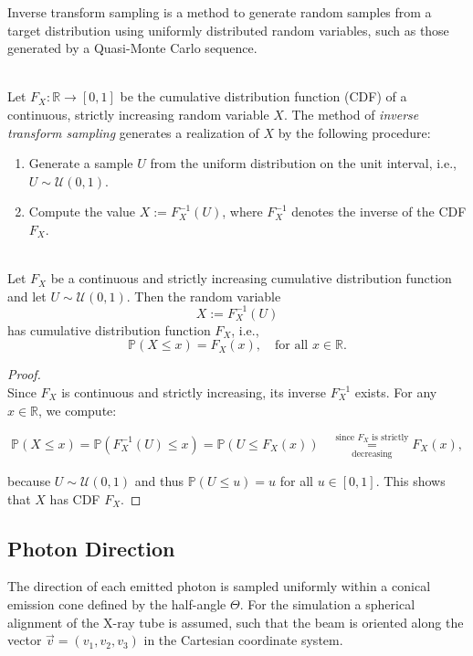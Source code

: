 Inverse transform sampling \cite{muller2012monte} is a method to generate random samples from a target distribution using uniformly distributed random variables, such as those generated by a Quasi-Monte Carlo sequence.

\begin{definition}\ \\
    \label{def:inverse_transform_sampling}
    Let $F_X: \mathbb{R} \to [0,1]$ be the cumulative distribution function (CDF) of a continuous, strictly increasing random variable $X$. The method of \emph{inverse transform sampling} generates a realization of $X$ by the following procedure:

    \begin{enumerate}
        \item Generate a sample $U$ from the uniform distribution on the unit interval, i.e., $U \sim \mathcal{U}(0,1)$.
        \item Compute the value $X := F_X^{-1}(U)$, where $F_X^{-1}$ denotes the inverse of the CDF $F_X$.
    \end{enumerate}
\end{definition}

\begin{theorem}\ \\
Let $F_X$ be a continuous and strictly increasing cumulative distribution function and let $U \sim \mathcal{U}(0,1)$. Then the random variable
\[
X := F_X^{-1}(U)
\]
has cumulative distribution function $F_X$, i.e.,
\[
\mathbb{P}(X \leq x) = F_X(x), \quad \text{for all } x \in \mathbb{R}.
\]
\end{theorem}

\begin{proof}\ \\
Since $F_X$ is continuous and strictly increasing, its inverse $F_X^{-1}$ exists. For any $x \in \mathbb{R}$, we compute:

\[
\mathbb{P}(X \leq x) = \mathbb{P}(F_X^{-1}(U) \leq x)
= \mathbb{P}(U \leq F_X(x)) \quad  \underset{\text{decreasing}}{\overset{\text{since } F_X \text{ is strictly}}{=}} F_X(x),
\]

because \( U \sim \mathcal{U}(0,1) \) and thus \( \mathbb{P}(U \leq u) = u \) for all \( u \in [0,1] \). This shows that \( X \) has CDF \( F_X \).
\end{proof}


\subsection*{Photon Direction}
The direction of each emitted photon is sampled uniformly within a conical
emission cone defined by the half-angle $\Theta$. For the simulation a spherical alignment of the X-ray tube is assumed, such that the beam is oriented along the vector $\vec{v} = (v_1,v_2,v_3)$ in the Cartesian coordinate system.


